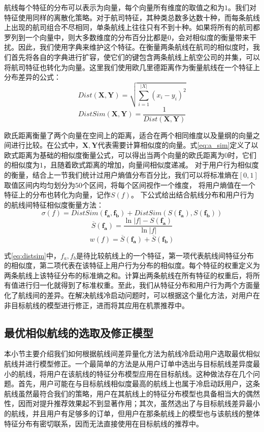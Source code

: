 航线每个特征的分布可以表示为向量，每个向量所有维度的取值之和为$1$。我们对特征使用同样的离散化策略。对于航司特征，其种类总数多达数十种，而每条航线上出现的航司组合不尽相同，单条航线上往往只有不到十种。如果将所有的航司都罗列到一个向量中，则大多数维度的分布百分比都是$0$，会对相似度的衡量带来干扰。因此，我们使用字典来维护这个特征。在衡量两条航线在航司的相似度时，我们首先将各自的字典进行扩容，使它们的键包含两条航线上航空公司的并集，可以将航司特征也转化为向量。这里我们使用欧几里德距离作为衡量航线在一个特征上分布差异的公式：
\begin{equation}
	Dist(\mathbf{X},\mathbf{Y}) = \sqrt{\sum_{i=1}^{|X|}(x_i-y_i)^2}
\end{equation}
\begin{equation}
\label{eq:a_sim}
	DistSim(\mathbf{X},\mathbf{Y}) = \frac{1}{Dist(\mathbf{X},\mathbf{Y})}
\end{equation}

欧氏距离衡量了两个向量在空间上的距离，适合在两个相同维度以及量纲的向量之间进行比较。在公式中，$\mathbf{X}, \mathbf{Y}$代表需要计算相似度的向量。式\ref{eq:a_sim}定义了以欧式距离为基础的相似度衡量公式，可以得出当两个向量的欧氏距离为$0$时，它们的相似度为$1$，且随着欧式距离的增加，向量间相似度递减。
对于用户行为相似度的衡量，结合上一节我们统计过用户熵值分布百分比，我们可以将标准熵在$[0,1]$取值区间内均匀划分为$50$个区间，将每个区间视作一个维度，
将用户熵值在一个特征上的分布也转化为向量，记作$S(f)$。
下公式给出结合航线分布和用户行为的航线间特征相似度衡量方法：
\begin{equation}
  \label{eq:distsim}
	\sigma(f) = DistSim(\mathbf{f_a,f_b}) + DistSim(S(\mathbf{f_a}),S(\mathbf{f_b}))
\end{equation}
\begin{equation}
	\overline{S}(\mathbf{f_a}) = \frac{\ln |f| - S(\mathbf{f_a})}{\ln |f|}
\end{equation}
\begin{equation}
	w(f) = \overline{S}(\mathbf{f_a}) + \overline{S}(\mathbf{f_b})
\end{equation}

式\ref{eq:distsim}中，$f_a, f_b$是待比较航线上的一个特征，第一项代表航线间特征分布的相似度，第二项代表在该特征上用户行为分布的相似度。每个特征的权重定义为两条航线上该特征分布的标准熵之和。计算出两条航线在所有特征的权重后，将所有值进行归一化就得到了标准权重。至此，我们从特征分布和用户行为两个方面量化了航线间的差异。在解决航线冷启动问题时，可以根据这个量化方法，对用户在非目标航线的模型进行修正，进而将其应用在机票推荐中。

\subsection{最优相似航线的选取及修正模型}
本小节主要介绍我们如何根据航线间差异量化方法为航线冷启动用户选取最优相似航线并进行模型修正。一个最简单的方法是从用户订单中选出与目标航线差异度最小的航线，将用户在该航线的特征分布模型应用在目标航线。这种做法存在几个问题。首先，用户可能在与目标航线相似度最高的航线上也属于冷启动跃用户，这条航线虽然最符合我们的策略，用户在其航线上的特征分布模型也具备相当大的偶然性，因而对提升推荐效果起不到显著作用；其次，虽然选出了与目标航线差异最小的航线，并且用户有足够多的订单，但用户在那条航线上的模型也与该航线的整体特征分布有密切联系，因而无法直接使用在目标航线的推荐中。

